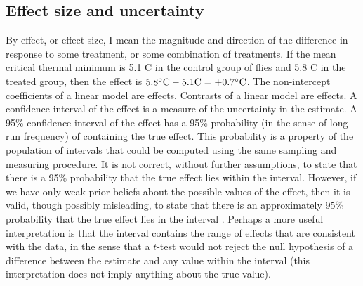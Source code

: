 \documentclass[fleqn,10pt,lineno]{wlpeerj} %
\begin{document}
\subsection*{Effect size and uncertainty}
By effect, or effect size, I mean the magnitude and direction of the difference in response to some treatment, or some combination of treatments. If the mean critical thermal minimum is 5.1 \degree C in the control group of flies and 5.8 \degree C in the treated group, then the effect is $5.8 \degree \textrm{C} - 5.1 \textrm{C} = +0.7 \degree \textrm{C}$. The non-intercept coefficients of a linear model are effects. Contrasts of a linear model are effects. A confidence interval of the effect is a measure of the uncertainty in the estimate.  A 95\% confidence interval of the effect has a 95\% probability (in the sense of long-run frequency) of containing the true effect. This probability is a property of the population of intervals that could be computed using the same sampling and measuring procedure. It is not correct, without further assumptions, to state that there is a 95\% probability that the true effect lies within the interval. However, if we have only weak prior beliefs about the possible values of the effect, then it is valid, though possibly misleading, to state that there is an approximately 95\% probability that the true effect lies in the interval \citep{Greenland_Living_2013, Gelman_Values_2013}. Perhaps a more useful interpretation is that the interval contains the range of effects that are consistent with the data, in the sense that a $t$-test would not reject the null hypothesis of a difference between the estimate and any value within the interval (this interpretation does not imply anything about the true value).
\end{document}
